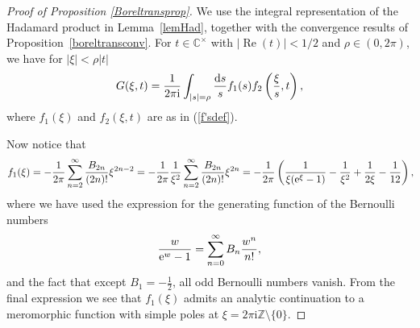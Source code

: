 \documentclass[pdftex]{sigma}
\numberwithin{equation}{section}
\begin{document}
\begin{proof}[Proof of Proposition \ref{Boreltransprop}]
We use the integral representation of the Hadamard product in Lemma~\ref{lemHad}, together with the convergence results of Proposition~\ref{boreltransconv}. For $t\in \mathbb{C}^{\times}$ with $|\operatorname{Re}(t)|<1/2$ and $\rho \in (0,2\pi)$, we have for $|\xi|<\rho|t|$
\begin{equation*}
 G(\xi,t)=\frac{1}{2\pi \mathrm i}\int_{|s|=\rho}\frac{{\rm d}s}{s}f_1(s)f_2\left(\frac{\xi}{s},t\right),
\end{equation*}
where $f_1(\xi)$ and $f_2(\xi,t)$ are as in (\ref{f'sdef}).

Now notice that
\begin{gather*}
 f_1(\xi) =- \frac{1}{2\pi}\sum_{n=2}^{\infty} \frac{ B_{2n}}{ (2n)!} \xi^{2n-2}= - \frac{1}{2\pi}\frac{1}{\xi^2}\sum_{n=2}^{\infty} \frac{ B_{2n}}{ (2n)!} \xi^{2n}
 =- \frac{1}{2\pi}\left( \frac{1}{\xi({\rm e}^{\xi}-1)} -\frac{1}{\xi^2}+\frac{1}{2\xi}-\frac{1}{12}\right),\!
 \end{gather*}
where we have used the expression for the generating function of the Bernoulli numbers
\begin{equation*}%
\frac{w}{{\rm e}^w-1} = \sum_{n=0}^{\infty} B_n \frac{w^n}{n!},
\end{equation*}
and the fact that except $B_1=-\frac12$, all odd Bernoulli numbers vanish. From the final expression we see that $f_1(\xi)$ admits an analytic continuation to a meromorphic function with simple poles at $\xi=2\pi \mathrm{i} \mathbb{Z} \setminus \{0\}$.


\end{proof}
\end{document}
